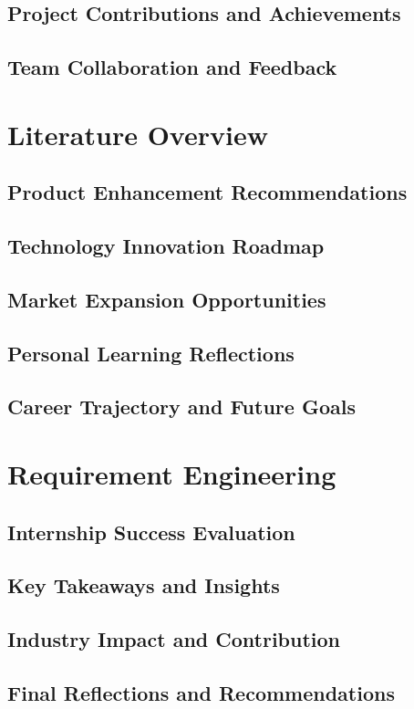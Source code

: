 \documentclass[a4paper, 11pt, oneside]{report}
\begin{document}
\section{Project Contributions and Achievements}
\section{Team Collaboration and Feedback}


\chapter{Literature Overview}
\section{Product Enhancement Recommendations}
\section{Technology Innovation Roadmap}
\section{Market Expansion Opportunities}
\section{Personal Learning Reflections}
\section{Career Trajectory and Future Goals}


\chapter{Requirement Engineering}
\section{Internship Success Evaluation}
\section{Key Takeaways and Insights}
\section{Industry Impact and Contribution}
\section{Final Reflections and Recommendations}

\end{document}
